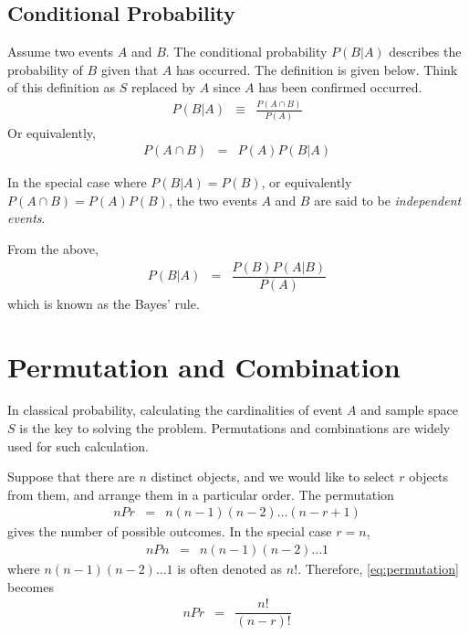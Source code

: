 \subsection{Conditional Probability}

Assume two events $A$ and $B$. The conditional probability $P(B|A)$ describes the probability of $B$ given that $A$ has occurred. The definition is given below. Think of this definition as $S$ replaced by $A$ since $A$ has been confirmed occurred.
\begin{eqnarray}
  P(B|A) &\equiv& \frac{P(A\cap B)}{P(A)} \nonumber
\end{eqnarray}
Or equivalently,
\begin{eqnarray}
  P(A\cap B) &=& P(A)P(B|A) \nonumber
\end{eqnarray}

In the special case where $P(B|A)=P(B)$, or equivalently $P(A\cap B) = P(A)P(B)$, the two events $A$ and $B$ are said to be \textit{independent events}.

From the above,
\begin{eqnarray}
  P(B|A) &=& \dfrac{P(B)P(A|B)}{P(A)} \nonumber
\end{eqnarray}
which is known as the Bayes' rule.

\section{Permutation and Combination}

In classical probability, calculating the cardinalities of event $A$ and sample space $S$ is the key to solving the problem. Permutations and combinations are widely used for such calculation.

Suppose that there are $n$ distinct objects, and we would like to select $r$ objects from them, and arrange them in a particular order. The permutation
\begin{eqnarray}
  nPr &=& n(n-1)(n-2)\ldots(n-r+1) \label{eq:permutation}
\end{eqnarray}
gives the number of possible outcomes. In the special case $r=n$,
\begin{eqnarray}
  nPn &=& n(n-1)(n-2)\ldots 1 \nonumber
\end{eqnarray}
where $n(n-1)(n-2)\ldots 1$ is often denoted as $n!$. Therefore, \eqref{eq:permutation} becomes
\begin{eqnarray}
  nPr &=& \dfrac{n!}{(n-r)!} \nonumber
\end{eqnarray}

